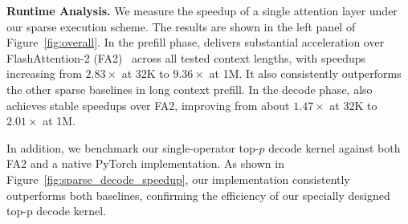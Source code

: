 
\noindent\textbf{Runtime Analysis.} We measure the speedup of a single attention layer under our sparse execution scheme. The results are shown in the left panel of Figure~\ref{fig:overall}. In the prefill phase, \name delivers substantial acceleration over FlashAttention-2 (FA2)~\citep{dao2024flashattention} across all tested context lengths, with speedups increasing from $2.83\times$ at 32K to $9.36\times$ at 1M. It also consistently outperforms the other sparse baselines in long context prefill. In the decode phase, \name also achieves stable speedups over FA2, improving from about $1.47\times$ at 32K to $2.01\times$ at 1M. 

In addition, we benchmark our single-operator top-$p$ decode kernel against both FA2 and a native PyTorch implementation. As shown in Figure~\ref{fig:sparse_decode_speedup}, our implementation consistently outperforms both baselines, confirming the efficiency of our specially designed top-p decode kernel.
